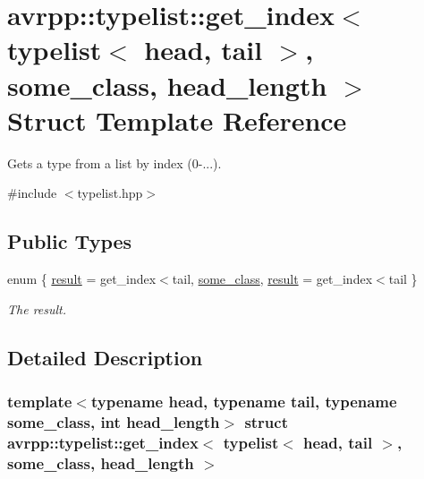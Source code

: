 \hypertarget{structavrpp_1_1typelist_1_1get__index_3_01typelist_3_01head_00_01tail_01_4_00_01some__class_00_01head__length_01_4}{
\section{avrpp::typelist::get\_\-index$<$ typelist$<$ head, tail $>$, some\_\-class, head\_\-length $>$ Struct Template Reference}
\label{structavrpp_1_1typelist_1_1get__index_3_01typelist_3_01head_00_01tail_01_4_00_01some__class_00_01head__length_01_4}
}


Gets a type from a list by index (0-\/...).  




{\ttfamily \#include $<$typelist.hpp$>$}

\subsection*{Public Types}
\begin{DoxyCompactItemize}
\item 
enum \{ \hyperlink{structavrpp_1_1typelist_1_1get__index_3_01typelist_3_01head_00_01tail_01_4_00_01some__class_00_01head__length_01_4_a6223a4c1f847b070f8660a14e7ba6cb2af7a64a0fdd6f3e2f63037a7fbdd6d5dd}{result} =  get\_\-index$<$tail, 
\hyperlink{structavrpp_1_1typelist_1_1get__index_3_01typelist_3_01head_00_01tail_01_4_00_01some__class_00_01head__length_01_4_a6223a4c1f847b070f8660a14e7ba6cb2ab7f67a5f2940369ba46b5799df67d42c}{some\_\-class}, 
\hyperlink{structavrpp_1_1typelist_1_1get__index_3_01typelist_3_01head_00_01tail_01_4_00_01some__class_00_01head__length_01_4_a6223a4c1f847b070f8660a14e7ba6cb2af7a64a0fdd6f3e2f63037a7fbdd6d5dd}{result} =  get\_\-index$<$tail
 \}
\begin{DoxyCompactList}\small\item\em The result. \item\end{DoxyCompactList}\end{DoxyCompactItemize}


\subsection{Detailed Description}
\subsubsection*{template$<$typename head, typename tail, typename some\_\-class, int head\_\-length$>$ struct avrpp::typelist::get\_\-index$<$ typelist$<$ head, tail $>$, some\_\-class, head\_\-length $>$}

